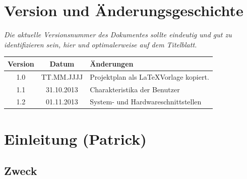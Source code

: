 \documentclass[fontsize=12pt,paper=a4,twoside]{scrartcl}
\begin{document}


\newpage

  \thispagestyle{fancy}
  \fancyhead{}
  \fancyfoot{}
  \renewcommand{\headrulewidth}{0.4pt}
  \tableofcontents
  \listoffigures %
  \listoftables %

\newpage



\section*{Version und Änderungsgeschichte}

{\em Die aktuelle Versionsnummer des Dokumentes sollte eindeutig und gut zu
identifizieren sein, hier und optimalerweise auf dem Titelblatt.}

\begin{tabular}{ccl}
Version & Datum & Änderungen \\
\hline
1.0 & TT.MM.JJJJ & Projektplan als \LaTeX Vorlage kopiert.\\
1.1 & 31.10.2013 & Charakteristika der Benutzer\\
1.2 & 01.11.2013 & System- und Hardwareschnittstellen \\
\end{tabular}


\section{Einleitung (Patrick)}


\subsection{Zweck}
\end{document}

